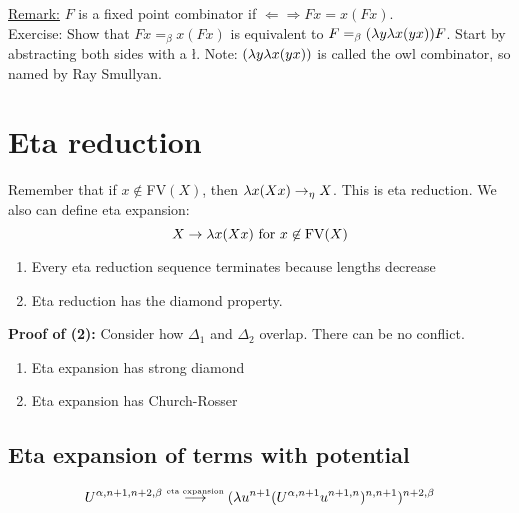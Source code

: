 \uline{Remark:} $F$ is a fixed point combinator if $\Leftarrow\Rightarrow Fx = x(Fx)$.\\ 

Exercise: Show that $Fx =_\beta x(Fx)$ is equivalent to $F =_\beta (\lambda y \lambda x (yx))F$. Start by abstracting both sides with a \l. Note: $(\lambda y \lambda x (yx))$ is called the owl combinator, so named by Ray Smullyan.

\section{Eta reduction}
Remember that if $x \not\in$FV$(X)$, then $\lambda x (Xx) \rightarrow_\eta X$. This is eta reduction. We also can define eta expansion:
\begin{equation*}
  X \rightarrow \lambda x(Xx) \hbox{ for } x \not\in \hbox{FV}(X)
\end{equation*}
\begin{enumerate}[(1)]
  \item Every eta reduction sequence terminates because lengths decrease
  \item Eta reduction has the diamond property.
\end{enumerate}
\begin{center}
\end{center}
\textbf{Proof of (2):} Consider how $\Delta_1$ and $\Delta_2$ overlap. There can be no conflict.

\begin{enumerate}[(3)]
  \item Eta expansion has strong diamond
  \item Eta expansion has Church-Rosser
\end{enumerate}

\subsection{Eta expansion of terms with potential}
\begin{equation*}
  U^{\alpha,n+1,n+2,\beta} \stackrel{\hbox{\tiny eta expansion}}{\longrightarrow} (\lambda u^{n+1} (U^{\alpha,n+1}u^{n+1,n})^{n,n+1})^{n+2,\beta}
\end{equation*}